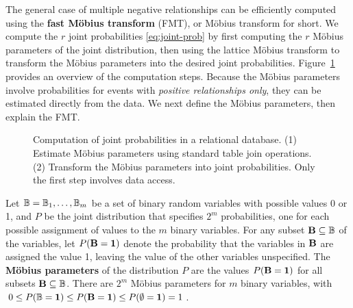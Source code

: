 \documentclass{article}
\begin{document}
The general case of multiple negative relationships can be efficiently computed using
the \textbf{fast M\"obius transform} (FMT), or M\"obius transform for short. 
We compute the $r$ joint probabilities \eqref{eq:joint-prob}  by first computing the $r$  M\"obius parameters of the joint distribution, then using the lattice M\"obius transform to transform the M\"obius parameters into the desired joint probabilities. Figure~\ref{fig:flow} provides an overview of the computation steps. Because the M\"obius parameters involve probabilities  for events with {\em positive relationships only}, they can be estimated directly from the data. 
We next define the M\"obius parameters, then explain the FMT.

\begin{figure}[t]
\begin{center}
\caption{Computation of joint probabilities in a relational database. (1) Estimate M\"obius parameters using standard table join operations. (2) Transform the M\"obius parameters into joint probabilities. 
Only the first step involves data access.
\label{fig:flow}}
\end{center}
\end{figure}


Let $\mathbb{B} = \mathbb{B}_{1},\ldots,\mathbb{B}_{m}$ be a set of binary random variables with possible values 0 or 1, and $P$ be the joint distribution that specifies $2^{m}$ probabilities, one for each possible assignment of values to the $m$ binary variables. For any subset $\mathbf{B} \subseteq \mathbb{B}$ of the variables, let $P(\mathbf{B} = \mathbf{1})$ denote the probability that the variables in $\mathbf{B}$ are assigned the value 1, leaving the value of the other variables unspecified. The \textbf{M\"obius parameters} of the distribution $P$ are the values $P(\mathbf{B} = \mathbf{1})$ for all subsets $\mathbf{B} \subseteq \mathbb{B}$\cite[Sec.3]{Drton08}.
There are $2^{m}$ M\"obius parameters for $m$ binary variables, with $0\leq P(\mathbb{B}=\mathbf{1})\leq P(\mathbf{B}=\mathbf{1})\leq P(\emptyset=\mathbf{1}) = 1$.
\end{document}
